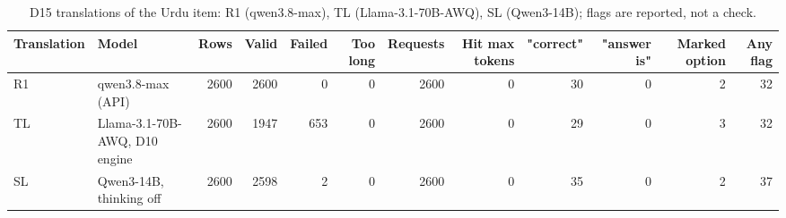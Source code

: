\begin{table}[t]
\centering
\small
\caption{D15 translations of the Urdu item: R1 (qwen3.8-max), TL (Llama-3.1-70B-AWQ), SL (Qwen3-14B); flags are reported, not a check.}
\label{tab:d15-translations}
\begin{tabular}{llrrrrrrrrrr}
\toprule
Translation & Model & Rows & Valid & Failed & Too long & Requests & Hit max tokens & "correct" & "answer is" & Marked option & Any flag \\
\midrule
R1 & qwen3.8-max (API) & 2600 & 2600 & 0 & 0 & 2600 & 0 & 30 & 0 & 2 & 32 \\
TL & Llama-3.1-70B-AWQ, D10 engine & 2600 & 1947 & 653 & 0 & 2600 & 0 & 29 & 0 & 3 & 32 \\
SL & Qwen3-14B, thinking off & 2600 & 2598 & 2 & 0 & 2600 & 0 & 35 & 0 & 2 & 37 \\
\bottomrule
\end{tabular}
\end{table}
